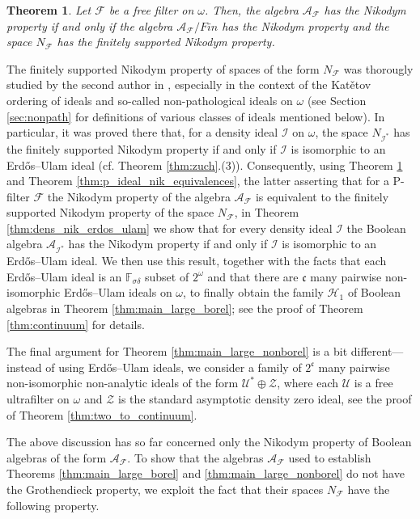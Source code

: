 \documentclass[a4paper,11pt,fleqn]{amsart}
\newtheorem{theoreml}{Theorem}[section]
\theoremstyle{definition}
\theoremstyle{remark}
\numberwithin{equation}{section}
\newcommand{\frakc}{\mathfrak{c}}
\newcommand{\aA}{\mathcal{A}}
\newcommand{\fF}{\mathcal{F}}
\newcommand{\hH}{\mathcal{H}}
\newcommand{\iI}{\mathcal{I}}
\newcommand{\uU}{\mathcal{U}}
\newcommand{\zZ}{\mathcal{Z}}
\newcommand{\Cantor}{2^\omega}
\newcommand{\erdos}{{Erd\H{o}s}}
\begin{document}
\begin{theoreml}\label{thm:main_sf_nik_nf_sfs}
Let $\fF$ be a free filter on $\omega$. Then, the algebra $\aA_{\fF}$ has the Nikodym property if and only if the algebra $\aA_{\fF}/Fin$ has the Nikodym property and the space $N_{\fF}$ has the finitely supported Nikodym property.
\end{theoreml}
%

The finitely supported Nikodym property of spaces of the form $N_\fF$ was thorougly studied by the second author in \cite{Zuc25}, especially in the context of the Kat\v{e}tov ordering of ideals and so-called non-pathological ideals on $\omega$ (see Section \ref{sec:nonpath} for definitions of various classes of ideals mentioned below). In particular, it was proved there that, for a density ideal $\iI$ on $\omega$, the space $N_{\iI^*}$ has the finitely supported Nikodym property if and only if $\iI$ is isomorphic to an \erdos--Ulam ideal (cf. Theorem \ref{thm:zuch}.(3)). Consequently, using Theorem \ref{thm:main_sf_nik_nf_sfs} and Theorem \ref{thm:p_ideal_nik_equivalences}, the latter asserting that for a P-filter $\fF$ the Nikodym property of the algebra $\aA_\fF$ is equivalent to the finitely supported Nikodym property of the space $N_\fF$, in Theorem \ref{thm:dens_nik_erdos_ulam} we show that for every density ideal $\iI$ the Boolean algebra $\aA_{\iI^*}$ has the Nikodym property if and only if $\iI$ is isomorphic to an \erdos--Ulam ideal. We then use this result, together with the facts that each \erdos--Ulam ideal is an $\mathbb{F}_{\sigma\delta}$ subset of $\Cantor$ and that there are $\frakc$ many pairwise non-isomorphic \erdos--Ulam ideals on $\omega$, to finally obtain the family $\hH_1$ of Boolean algebras in Theorem \ref{thm:main_large_borel}; see the proof of Theorem \ref{thm:continuum} for details. 

The final argument for Theorem \ref{thm:main_large_nonborel} is a bit different---instead of using \erdos--Ulam ideals, we consider a family of $2^\frakc$ many pairwise non-isomorphic non-analytic ideals of the form $\uU^*\oplus\zZ$, where each $\uU$ is a free ultrafilter on $\omega$ and $\zZ$ is the standard asymptotic density zero ideal, see the proof of Theorem \ref{thm:two_to_continuum}.

The above discussion has so far concerned only the Nikodym property of Boolean algebras of the form $\aA_\fF$. To show that the algebras $\aA_\fF$ used to establish Theorems \ref{thm:main_large_borel} and \ref{thm:main_large_nonborel} do not have the Grothendieck property, we exploit the fact that their spaces $N_\fF$ have the following property.
\end{document}
